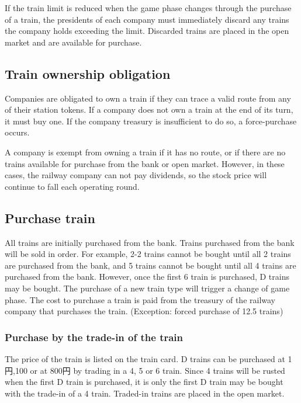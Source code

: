 \documentclass{article}
\begin{document}
\begin{CJK}{UTF8}{min}
\begin{multicols}{2}
If the train limit is reduced when the game phase changes through the
purchase of a train, the presidents of each company must immediately
discard any trains the company holds exceeding the limit. Discarded
trains are placed in the open market and are available for purchase.

\subsection{Train ownership obligation}

Companies are obligated to own a train if they can trace a valid route
from any of their station tokens. If a company does not own a train at
the end of its turn, it must buy one. If the company treasury is
insufficient to do so, a force-purchase occurs.

A company is exempt from owning a train if it has no route, or if
there are no trains available for purchase from the bank or open
market. However, in these cases, the railway company can not pay
dividends, so the stock price will continue to fall each operating
round.

\subsection{Purchase train}

All trains are initially purchased from the bank. Trains purchased
from the bank will be sold in order. For example, 2-2 trains cannot be
bought until all 2 trains are purchased from the bank, and 5 trains
cannot be bought until all 4 trains are purchased from the
bank. However, once the first 6 train is purchased, D trains may be
bought. The purchase of a new train type will trigger a change of game
phase. The cost to purchase a train is paid from the treasury of the
railway company that purchases the train. (Exception: forced purchase
of 12.5 trains)

\subsubsection{Purchase by the trade-in of the train}

The price of the train is listed on the train card. D trains can be
purchased at 1円,100 or at 800円 by trading in a 4, 5 or 6
train. Since 4 trains will be rusted when the first D train is
purchased, it is only the first D train may be bought with the
trade-in of a 4 train. Traded-in trains are placed in the open market.


\end{multicols}
\end{CJK}
\end{document}

